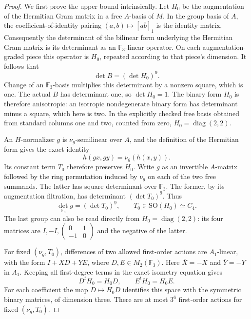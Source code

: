\begin{proof}
We first prove the upper bound intrinsically. Let \(H_0\) be the
augmentation of the Hermitian Gram matrix in a free \(A\)-basis of
\(M\). In the group basis of \(A\), the coefficient-of-identity
pairing \((a,b)\mapsto[a\bar b]_1\) is the identity matrix.
Consequently the determinant of the bilinear form underlying the
Hermitian Gram matrix is its determinant as an \(\mathbb F_3\)-linear
operator. On each augmentation-graded piece this operator is
\(H_0\), repeated according to that piece's dimension. It follows that
\[
                       \det B=(\det H_0)^9.
 \tag{NJ.10}
\]
Change of an \(\mathbb F_3\)-basis multiplies this determinant by a
nonzero square, which is one. The actual \(B\) has determinant one,
so \(\det H_0=1\). The binary form \(H_0\) is therefore anisotropic:
an isotropic nondegenerate binary form has determinant minus a square,
which here is two. In the explicitly checked free basis obtained from
standard columns one and two, counted from zero,
\(H_0=\operatorname{diag}(2,2)\).

An \(H\)-normalizer \(g\) is \(\nu_g\)-semilinear over \(A\), and
the definition of the Hermitian form gives the exact identity
\[
                  h(gx,gy)=\nu_g(h(x,y)).
 \tag{NJ.11}
\]
Its constant term \(T_0\) therefore preserves \(H_0\).
Write \(g\) as an invertible \(A\)-matrix followed by the ring
permutation induced by \(\nu_g\) on each of the two free summands.
The latter has square determinant over \(\mathbb F_3\).
The former, by its augmentation filtration, has determinant
\((\det T_0)^9\). Thus
\[
             \det_{\mathbb F_3}g=(\det T_0)^9,
 \qquad T_0\in\mathrm{SO}(H_0)\simeq C_4.
 \tag{NJ.12}
\]
The last group can also be read directly from
\(H_0=\operatorname{diag}(2,2)\): its four matrices are
\(I,-I,\left(\begin{smallmatrix}0&1\\-1&0\end{smallmatrix}\right)\)
and the negative of the latter.

For fixed \((\nu_g,T_0)\), differences of two allowed first-order
actions are \(A_1\)-linear, with the form
\(I+XD+YE\), where \(D,E\in M_2(\mathbb F_3)\).
Here \(\bar X=-X\) and \(\bar Y=-Y\) in \(A_1\).
Keeping all first-degree terms in the exact isometry equation gives
\[
                  D^tH_0=H_0D,\qquad E^tH_0=H_0E.
 \tag{NJ.13}
\]
For each coefficient the map \(D\mapsto H_0D\) identifies this
space with the symmetric binary matrices, of dimension three.
There are at most \(3^6\) first-order actions for fixed
\((\nu_g,T_0)\).


\end{proof}
